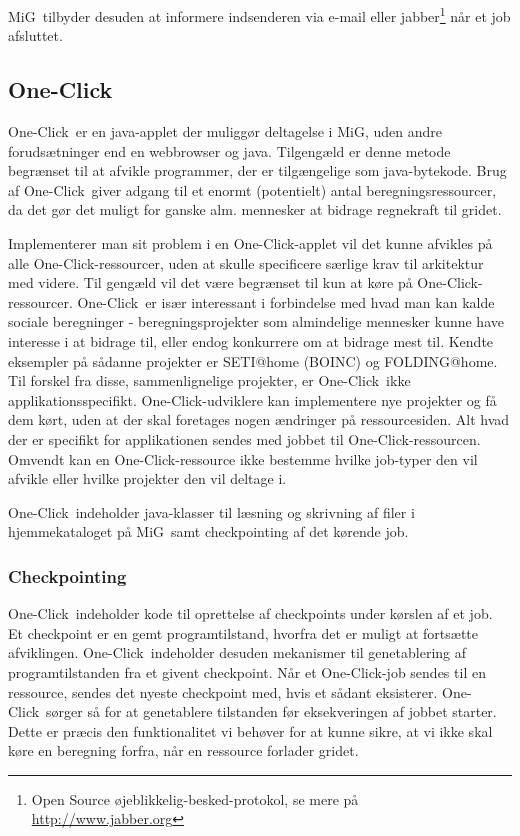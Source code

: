 \documentclass[final,a4paper,11pt]{article}
\newcommand{\mig}{MiG}
\newcommand{\oc}{One-Click}
\begin{document}
\mig\ tilbyder desuden at informere indsenderen via e-mail eller jabber\footnote{Open Source øjeblikkelig-besked-protokol, se mere på \url{http://www.jabber.org}} når et job afsluttet. 

\subsection{\oc} \label{oneclick}
\oc\ er en java-applet der muliggør deltagelse i \mig, uden andre forudsætninger end en webbrowser og java. Tilgengæld er denne metode begrænset til at afvikle programmer, der er tilgængelige som java-bytekode. Brug af \oc\ giver adgang til et enormt (potentielt) antal beregningsressourcer, da det gør det muligt for ganske alm. mennesker at bidrage regnekraft til gridet.

Implementerer man sit problem i en \oc-applet vil det kunne afvikles på alle \oc-ressourcer, uden at skulle specificere særlige krav til arkitektur med videre. Til gengæld vil det være begrænset til kun at køre på \oc-ressourcer.
\oc\ er især interessant i forbindelse med hvad man kan kalde sociale beregninger - beregningsprojekter som almindelige mennesker kunne have interesse i at bidrage til, eller endog konkurrere om at bidrage mest til. Kendte eksempler på sådanne projekter er SETI@home (BOINC) og FOLDING@home. Til forskel fra disse, sammenlignelige projekter, er \oc\ ikke applikationsspecifikt. \oc-udviklere kan implementere nye projekter og få dem kørt, uden at der skal foretages nogen ændringer på ressourcesiden. Alt hvad der er specifikt for applikationen sendes med jobbet til \oc-ressourcen. Omvendt kan en \oc-ressource ikke bestemme hvilke job-typer den vil afvikle eller hvilke projekter den vil deltage i.

\oc\ indeholder java-klasser til læsning og skrivning af filer i hjemmekataloget på \mig\, samt checkpointing af det kørende job. 

\subsubsection{Checkpointing}
\oc\ indeholder kode til oprettelse af checkpoints under kørslen af et job. Et checkpoint er en gemt programtilstand, hvorfra det er muligt at fortsætte afviklingen. \oc\ indeholder desuden mekanismer til genetablering af programtilstanden fra et givent checkpoint. Når et \oc-job sendes til en ressource, sendes det nyeste checkpoint med, hvis et sådant eksisterer. \oc\ sørger så for at genetablere tilstanden før eksekveringen af jobbet starter. Dette er præcis den funktionalitet vi behøver for at kunne sikre, at vi ikke skal køre en beregning forfra, når en ressource forlader gridet.
\end{document}
